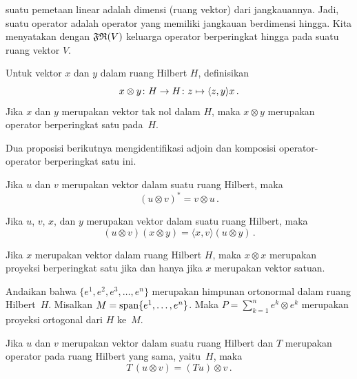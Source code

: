 \begin{defn}
 suatu pemetaan linear adalah dimensi (ruang vektor) dari jangkauannya. Jadi, suatu operator
 adalah operator yang memiliki jangkauan berdimensi hingga. Kita menyatakan dengan $\mathfrak{FR}(V)$
keluarga operator berperingkat hingga pada suatu ruang vektor $V$.
\end{defn}

\begin{exam}\label{0022431fa} Untuk vektor $x$ dan $y$ dalam ruang Hilbert $H$, definisikan
   \[ x \otimes y\colon H \rightarrow H \colon z \mapsto \langle z,y \rangle x\,. \]
Jika $x$ dan $y$ merupakan vektor tak nol dalam $H$, maka $x \otimes y$ merupakan operator berperingkat satu pada~$H$.
\end{exam}

Dua proposisi berikutnya mengidentifikasi adjoin dan komposisi operator-operator berperingkat satu ini.

\begin{prop} Jika $u$ dan $v$ merupakan vektor dalam suatu ruang Hilbert, maka
   \[ (u \otimes v)^* = v \otimes u\,. \]
\end{prop}

\begin{prop} Jika $u$, $v$, $x$, dan $y$ merupakan vektor dalam suatu ruang Hilbert, maka
    \[ (u \otimes v)(x \otimes y) = \langle x,v \rangle (u \otimes y)\,. \]
\end{prop}

\begin{prop} Jika $x$ merupakan vektor dalam ruang Hilbert $H$, maka $x \otimes x$ merupakan proyeksi berperingkat satu jika dan
hanya jika $x$ merupakan vektor satuan.
\end{prop}

\begin{prop} Andaikan bahwa $\{e^1, e^2, e^3, \dots, e^n\}$ merupakan himpunan ortonormal dalam ruang Hilbert~$H$. Misalkan
$M = \operatorname{span}\{e^1, \dots, e^n\}$. Maka $P = \sum_{k=1}^n e^k \otimes e^k$ merupakan proyeksi ortogonal dari $H$ ke~$M$.
\end{prop}

\begin{prop}\label{prop_op_act_otimes1} Jika $u$ dan $v$ merupakan vektor dalam suatu ruang Hilbert dan $T$ merupakan operator pada ruang Hilbert yang sama, yaitu~$H$, maka
   \[ T\,(u \otimes v) = (Tu) \otimes v\,. \]
\end{prop}

